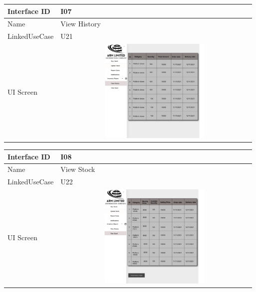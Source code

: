 \documentclass[12pt]{article}
\begin{document}
\begin{table}[H] 
\begin{tabular} {|m{6em}|m{12cm}|}
\hline
Interface ID & I07 \\ \hline
\newline
Name & View History\\ \hline
LinkedUseCase &  U21 \\ \hline
UI Screen &\newline \includegraphics [width=10cm, height=5cm] {8a.png} \\ \hline

\end{tabular}
\end{table}
\begin{table}[H] 
\begin{tabular} {|m{6em}|m{12cm}|}
\hline
Interface ID & I08 \\ \hline
\newline
Name & View Stock\\ \hline
LinkedUseCase & U22  \\ \hline
UI Screen &\newline \includegraphics [width=10cm, height=5cm] {9.png} \\ \hline

\end{tabular}
\end{table}
\end{document}
